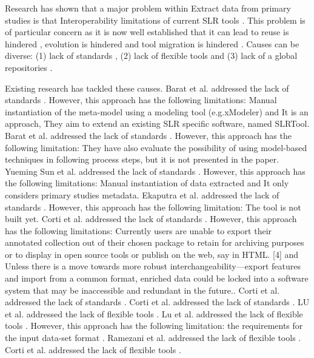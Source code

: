 \documentclass{article}
\begin{document}
Research has shown that a major problem within Extract data from primary studies is that Interoperability limitations of current SLR tools \cite{Tell2016} \cite{Al-Zubidy2017} \cite{Tell2016} \cite{Ramezani2017}. This problem is of particular concern as it is now well established that it can lead to reuse is hindered \cite{Al-Zubidy2017} \cite{Ramezani2017}, evolution is hindered \cite{Al-Zubidy2017} \cite{Al-Zubidy2017} \cite{Ekaputra2015} and tool migration is hindered \cite{Al-Zubidy2017} \cite{Al-Zubidy2017} \cite{Al-Zubidy2017} \cite{Subramanian2018}. Causes can be diverse: (1) lack of standards \cite{Yueming Sun2012} \cite{Barat2017} \cite{Gilbert2014}, (2) lack of flexible tools \cite{Tell2016} \cite{Tell2016} and (3) lack of a global repositories \cite{Ekaputra2015}. 
    
Existing research has tackled these causes. Barat et al. addressed the lack of standards \cite{Barat2017}. However, this approach has the following limitations: Manual instantiation of the meta-model using a modeling tool (e.g.xModeler) and It is an approach, They aim to extend an existing SLR specific software, named SLRTool. Barat et al. addressed the lack of standards \cite{Barat2017}. However, this approach has the following limitation: They have also evaluate the possibility of using model-based techniques in following process steps, but it is not presented in the paper. Yueming Sun et al. addressed the lack of standards \cite{Yueming Sun2012}. However, this approach has the following limitations: Manual instantiation of data extracted and It only considers primary studies metadata. Ekaputra et al. addressed the lack of standards \cite{Ekaputra2015}. However, this approach has the following limitation: The tool is not built yet. Corti et al. addressed the lack of standards \cite{Corti2011}. However, this approach has the following limitations: Currently users are unable to export their annotated collection out of their chosen package to retain for archiving purposes or to display in open source tools or publish on the web, say in HTML. [4] and Unless there is a move towards more robust interchangeability—export features and import from a common format, enriched data could be locked into a software system that may be inaccessible and redundant in the future.. Corti et al. addressed the lack of standards \cite{Corti2011}. Corti et al. addressed the lack of standards \cite{Corti2011}. LU et al. addressed the lack of flexible tools \cite{LU2008}. Lu et al. addressed the lack of flexible tools \cite{Lu2008}. However, this approach has the following limitation: the requirements for the input data-set format \cite{Lu2008}. Ramezani et al. addressed the lack of flexible tools \cite{Ramezani2017}. Corti et al. addressed the lack of flexible tools \cite{Corti2011}. 
    
\end{document}
